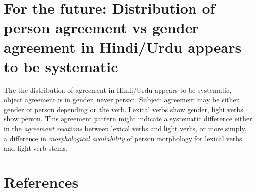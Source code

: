 \documentclass{article}
\begin{document}
\section{For the future: Distribution of person agreement vs gender agreement in Hindi/Urdu appears to be systematic}

The the distribution of agreement in Hindi/Urdu appears to be systematic, object agreement is in gender, never person. Subject agreement may be either gender or person depending on the verb. Lexical verbs show gender, light verbs show person. This agreement pattern might indicate a systematic difference either in the \textit{agreement relations} between lexical verbs and light verbs, or more simply, a difference in \textit{morphological availability} of person morphology for lexical verbs and light verb stems.

\appendix

\section{References}
\end{document}
